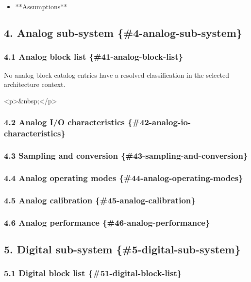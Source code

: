 \documentclass[11pt]{article}
\begin{document}
\begin{itemize}
\item **Assumptions**
\end{itemize}


\subsection{4. Analog sub-system \{\#4-analog-sub-system\}}


\subsubsection{4.1 Analog block list \{\#41-analog-block-list\}}


No analog block catalog entries have a resolved classification in the selected architecture context.

<p>\&nbsp;</p>

\subsubsection{4.2 Analog I/O characteristics \{\#42-analog-io-characteristics\}}


\subsubsection{4.3 Sampling and conversion \{\#43-sampling-and-conversion\}}


\subsubsection{4.4 Analog operating modes \{\#44-analog-operating-modes\}}


\subsubsection{4.5 Analog calibration \{\#45-analog-calibration\}}


\subsubsection{4.6 Analog performance \{\#46-analog-performance\}}


\subsection{5. Digital sub-system \{\#5-digital-sub-system\}}


\subsubsection{5.1 Digital block list \{\#51-digital-block-list\}}
\end{document}
